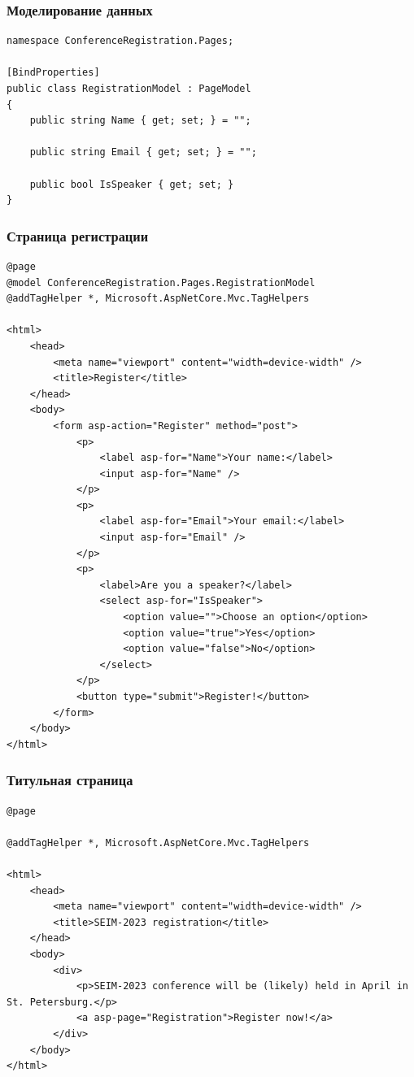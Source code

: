 \documentclass{../../slides-style}
\begin{document}
    \begin{frame}[fragile]
        \frametitle{Моделирование данных}
        \begin{verbatim}
namespace ConferenceRegistration.Pages;

[BindProperties]
public class RegistrationModel : PageModel
{
    public string Name { get; set; } = "";

    public string Email { get; set; } = "";

    public bool IsSpeaker { get; set; }
}
        \end{verbatim}
    \end{frame}

    \begin{frame}[fragile]
        \frametitle{Страница регистрации}
        \begin{ssmall}
            \begin{verbatim}
@page
@model ConferenceRegistration.Pages.RegistrationModel
@addTagHelper *, Microsoft.AspNetCore.Mvc.TagHelpers

<html>
    <head>
        <meta name="viewport" content="width=device-width" />
        <title>Register</title>
    </head>
    <body>
        <form asp-action="Register" method="post">
            <p>
                <label asp-for="Name">Your name:</label>
                <input asp-for="Name" />
            </p>
            <p>
                <label asp-for="Email">Your email:</label>
                <input asp-for="Email" />
            </p>
            <p>
                <label>Are you a speaker?</label>
                <select asp-for="IsSpeaker">
                    <option value="">Choose an option</option>
                    <option value="true">Yes</option>
                    <option value="false">No</option>
                </select>
            </p>
            <button type="submit">Register!</button>
        </form>
    </body>
</html>
            \end{verbatim}
        \end{ssmall}
    \end{frame}

    \begin{frame}[fragile]
        \frametitle{Титульная страница}
        \begin{footnotesize}
            \begin{verbatim}
@page

@addTagHelper *, Microsoft.AspNetCore.Mvc.TagHelpers

<html>
    <head>
        <meta name="viewport" content="width=device-width" />
        <title>SEIM-2023 registration</title>
    </head>
    <body>
        <div>
            <p>SEIM-2023 conference will be (likely) held in April in St. Petersburg.</p>
            <a asp-page="Registration">Register now!</a>
        </div>
    </body>
</html>
            \end{verbatim}
        \end{footnotesize}
    \end{frame}
\end{document}

